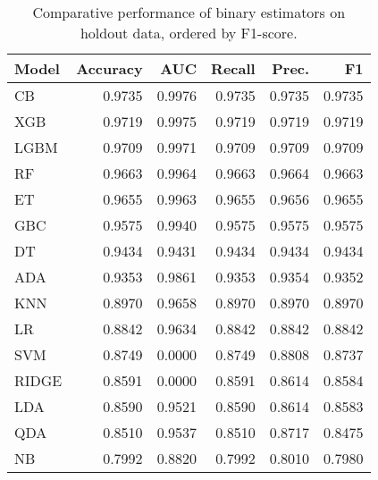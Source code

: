 \begin{table}
\caption{Comparative performance of binary estimators on holdout data, ordered by F1-score.}
\label{tbl:binary_ho_res_top_models_df}
\begin{tabular}{lrrrrr}
\toprule
Model & Accuracy & AUC & Recall & Prec. & F1 \\
\midrule
CB & 0.9735 & 0.9976 & 0.9735 & 0.9735 & 0.9735 \\
XGB & 0.9719 & 0.9975 & 0.9719 & 0.9719 & 0.9719 \\
LGBM & 0.9709 & 0.9971 & 0.9709 & 0.9709 & 0.9709 \\
RF & 0.9663 & 0.9964 & 0.9663 & 0.9664 & 0.9663 \\
ET & 0.9655 & 0.9963 & 0.9655 & 0.9656 & 0.9655 \\
GBC & 0.9575 & 0.9940 & 0.9575 & 0.9575 & 0.9575 \\
DT & 0.9434 & 0.9431 & 0.9434 & 0.9434 & 0.9434 \\
ADA & 0.9353 & 0.9861 & 0.9353 & 0.9354 & 0.9352 \\
KNN & 0.8970 & 0.9658 & 0.8970 & 0.8970 & 0.8970 \\
LR & 0.8842 & 0.9634 & 0.8842 & 0.8842 & 0.8842 \\
SVM & 0.8749 & 0.0000 & 0.8749 & 0.8808 & 0.8737 \\
RIDGE & 0.8591 & 0.0000 & 0.8591 & 0.8614 & 0.8584 \\
LDA & 0.8590 & 0.9521 & 0.8590 & 0.8614 & 0.8583 \\
QDA & 0.8510 & 0.9537 & 0.8510 & 0.8717 & 0.8475 \\
NB & 0.7992 & 0.8820 & 0.7992 & 0.8010 & 0.7980 \\
\bottomrule
\end{tabular}
\end{table}
